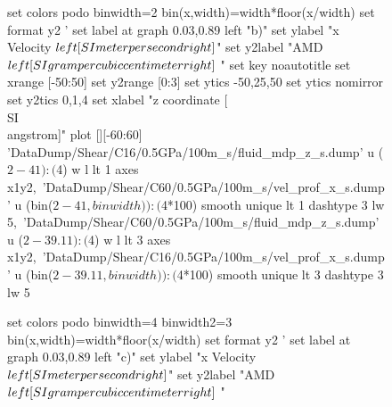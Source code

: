 \documentclass[5p]{elsarticle}
\begin{document}
\begin{figure}[htp]
\begin{center}
\begin{gnuplot}[terminal=epslatex, terminaloptions={size \SERFigwidth cm, \SERFigheight cm color solid}]
			set colors podo
			binwidth=2
			bin(x,width)=width*floor(x/width)
			set format y2 '%
			set label at graph 0.03,0.89 left "b)"
			set ylabel "x Velocity $\\left[ \\SI{}{\\meter\\per\\second} \\right]$"
			set y2label "AMD $\\left[ \\SI{}{\\gram\\per\\cubic\\centi\\meter} \\right]$ "
			set key noautotitle
			set xrange [-50:50]
			set y2range [0:3]
			set ytics  -50,25,50
			set ytics nomirror
			set y2tics 0,1,4
			set xlabel "z coordinate [\\SI{}{\\angstrom}]"  
			plot  	[][-60:60]  'DataDump/Shear/C16/0.5GPa/100m_s/fluid_mdp_z_s.dump' u ($2-41):($4) w l  lt 1 axes x1y2,\
				              'DataDump/Shear/C60/0.5GPa/100m_s/vel_prof_x_s.dump'  u (bin($2-41,binwidth)):($4*100) smooth unique lt 1 dashtype 3  lw 5,\
                             		    'DataDump/Shear/C60/0.5GPa/100m_s/fluid_mdp_z_s.dump' u ($2-39.11):($4) w l  lt 3  axes x1y2,\
				              'DataDump/Shear/C16/0.5GPa/100m_s/vel_prof_x_s.dump'  u (bin($2-39.11,binwidth)):($4*100) smooth unique lt 3 dashtype 3  lw 5
		\end{gnuplot}
		\begin{gnuplot}[terminal=epslatex, terminaloptions={size \SERFigwidth cm, \SERFigheight cm color solid}]
			set colors podo
			binwidth=4
			binwidth2=3
			bin(x,width)=width*floor(x/width)
			set format y2 '%
			set label at graph 0.03,0.89 left "c)"
			set ylabel "x Velocity $\\left[ \\SI{}{\\meter\\per\\second} \\right]$"
			set y2label "AMD $\\left[ \\SI{}{\\gram\\per\\cubic\\centi\\meter} \\right]$ "

\end{gnuplot}
\end{center}
\end{figure}
\end{document}
